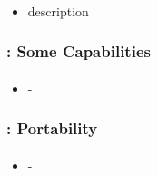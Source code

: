 \begin{frame}
\frametitle{\charm}
\framesubtitle{}
    \begin{itemize}
        \item description
    \end{itemize}
\end{frame}


\begin{frame}
\frametitle{\charm: Some Capabilities}
\framesubtitle{}
    \begin{itemize}
        \item -
    \end{itemize}
\end{frame}


\begin{frame}
\frametitle{\charm: Portability}
\framesubtitle{}
    \begin{itemize}
        \item -
    \end{itemize}
\end{frame}


